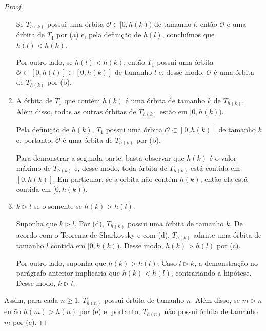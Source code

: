 \begin{proof}
\begin{enumerate}[label = (\alph*)]
Se $T_{h(k)}$ possui uma órbita $\mathcal{O} \in [0, h(k))$ de tamanho $l$, então $\mathcal{O}$ é uma órbita de $T_1$ por (a) e, pela definição de $h(l)$, concluímos que $h(l) < h(k)$.

Por outro lado, se $h(l) < h(k)$, então $T_1$ possui uma órbita $\mathcal{O} \subset [0, h(l)] \subset [0, h(k)]$ de tamanho $l$ e, desse modo, $\mathcal{O}$ é uma órbita de $T_{h(k)}$ por (b).

\item A órbita de $T_1$ que contém $h(k)$ é uma órbita de tamanho $k$ de $T_{h(k)}$. Além disso, todas as outras órbitas de $T_{h(k)}$ estão em $[0, h(k))$. 

Pela definição de $h(k)$, $T_1$ possui uma órbita $\mathcal{O} \subset [0, h(k)]$ de tamanho $k$ e, portanto, $\mathcal{O}$ é uma órbita de $T_{h(k)}$ por (b).

Para demonstrar a segunda parte, basta observar que $h(k)$ é o valor máximo de $T_{h(k)}$ e, desse modo, toda órbita de $T_{h(k)}$ está contida em $[0, h(k)]$. Em particular, se a órbita não contém $h(k)$, então ela está contida em $[0, h(k))$.

\item $k \triangleright l$ se o somente se $h(k) > h(l)$.

Suponha que $k \triangleright l$. Por (d), $T_{h(k)}$ possui uma órbita de tamanho $k$. De acordo com o Teorema de Sharkovsky e com (d), $T_{h(k)}$ admite uma órbita de tamanho $l$ contida em $[0, h(k))$. Desse modo,  $h(k) > h(l)$ por (c).

Por outro lado, suponha que $h(k) > h(l)$. Caso $l \triangleright k$, a demonstração no parágrafo anterior implicaria que $h(k) < h(l)$, contrariando a hipótese. Desse modo, $k \triangleright l$.
\end{enumerate}

Assim, para cada $n \geq 1$, $T_{h(n)}$ possui órbita de tamanho $n$. Além disso, se $m \triangleright n$ então $h(m) > h(n)$ por (e) e, portanto, $T_{h(n)}$ não possui órbita de tamanho $m$ por (c).
\end{proof}